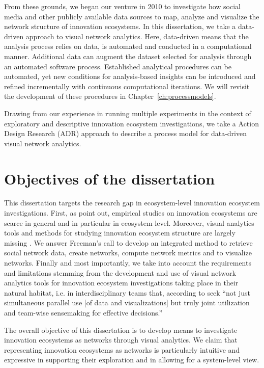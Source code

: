 From these grounds, we began our venture in 2010 to investigate how social media and other publicly available data sources to map, analyze and visualize the network structure of innovation ecosystems. In this dissertation, we take a data-driven approach to visual network analytics. Here, data-driven means that the analysis process relies on data, is automated and conducted in a computational manner. Additional data can augment the dataset selected for analysis through an automated software process. Established analytical procedures can be automated, yet new conditions for analysis-based insights can be introduced and refined incrementally with continuous computational iterations. We will revisit the development of these procedures in Chapter~\ref{ch:processmodels}.

Drawing from our experience in running multiple experiments in the context of exploratory and descriptive innovation ecosystem investigations, we take a Action Design Research (ADR) \citep{Sein2011ActionResearch} approach to describe a process model for data-driven visual network analytics.

\section{Objectives of the dissertation}
\label{sec:objectives}

This dissertation targets the research gap in ecosystem-level innovation ecosystem investigations. First, as \cite{Jarvi2016TakingReview} point out, empirical studies on innovation ecosystems are scarce in general and in particular in ecosystem level. Moreover, visual analytics tools and methods for studying innovation ecosystem structure are largely missing \citep[cf.][]{Basole2009VisualizationEcosystem}. We answer Freeman's \citeyear{Freeman2000VisualizingNetworks} call to develop an integrated method to retrieve social network data, create networks, compute network metrics and to visualize networks. Finally and most importantly, we take into account the requirements and limitations stemming from the development and use of visual network analytics tools for innovation ecosystem investigations taking place in their natural habitat, i.e. in interdisciplinary teams that, according to \cite{Bendoly2016FitAnalytics} seek ``not just simultaneous parallel use [of data and visualizations] but truly joint utilization and team-wise sensemaking for effective decisions.''

The overall objective of this dissertation is to develop means to investigate innovation ecosystems as networks through visual analytics. We claim that representing innovation ecosystems as networks is particularly intuitive and expressive in supporting their exploration and in allowing for a system-level view.

